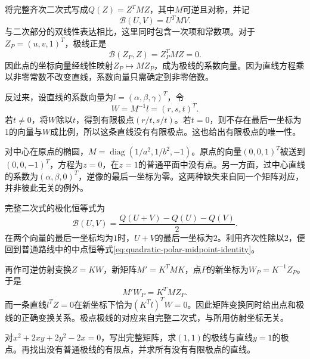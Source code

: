 将完整齐次二次式写成\(Q(Z)=Z^TMZ\)，其中\(M\)可逆且对称，并记
\begin{equation*}
 \mathcal B(U,V)=U^TMV.
\end{equation*}
与二次部分的双线性表达相比，这里同时包含一次项和常数项。对于\(Z_P=(u,v,1)^T\)，极线正是
\begin{equation}\label{eq:quadratic-matrix-polar}
 \mathcal B(Z_P,Z)=Z_P^TMZ=0.
\end{equation}
因此点的坐标向量经线性映射\(Z_P\mapsto MZ_P\)，成为极线的系数向量。因为直线方程乘以非零常数不改变直线，系数向量只需确定到非零倍数。

反过来，设直线的系数向量为\(l=(\alpha,\beta,\gamma)^T\)，令
\begin{equation}\label{eq:quadratic-matrix-pole}
 W=M^{-1}l=(r,s,t)^T.
\end{equation}
若\(t\ne0\)，将\(W\)除以\(t\)，得到有限极点\((r/t,s/t)\)。若\(t=0\)，则不存在最后一坐标为\(1\)的向量与\(W\)成比例，所以这条直线没有有限极点。这也给出有限极点的唯一性。

对中心在原点的椭圆，\(M=\operatorname{diag}(1/a^2,1/b^2,-1)\)。原点的向量\((0,0,1)^T\)被送到\((0,0,-1)^T\)，方程为\(z=0\)，在\(z=1\)的普通平面中没有点。另一方面，过中心直线的系数为\((\alpha,\beta,0)^T\)，逆像的最后一坐标为零。这两种缺失来自同一个矩阵对应，并非彼此无关的例外。

完整二次式的极化恒等式为
\begin{equation}\label{eq:quadratic-full-polarization}
 \mathcal B(U,V)=\frac{Q(U+V)-Q(U)-Q(V)}2.
\end{equation}
在两个向量的最后一坐标均为\(1\)时，\(U+V\)的最后一坐标为\(2\)。利用齐次性除以\(2\)，便回到普通路线中的中点恒等式\eqref{eq:quadratic-polar-midpoint-identity}。

再作可逆仿射变换\(Z=KW\)，新矩阵\(M'=K^TMK\)，点\(P\)的新坐标为\(W_P=K^{-1}Z_P\)。于是
\begin{equation*}
 M'W_P=K^TMZ_P.
\end{equation*}
而一条直线\(l^TZ=0\)在新坐标下恰为\((K^Tl)^TW=0\)。因此矩阵变换同时给出点和极线的正确变换关系。极点极线的对应来自完整二次式，与所用仿射坐标无关。

\par\noindent\begin{minipage}{\linewidth}
\begin{example}
对\(x^2+2xy+2y^2-2x=0\)，写出完整矩阵，求\((1,1)\)的极线与直线\(y=1\)的极点。再找出没有普通极线的有限点，并求所有没有有限极点的直线。
\end{example}
\end{minipage}\par

